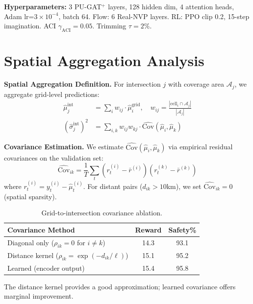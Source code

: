 \documentclass{article}
\theoremstyle{plain}
\theoremstyle{definition}
\theoremstyle{remark}
\begin{document}
\textbf{Hyperparameters:} 3 PU-GAT$^+$ layers, 128 hidden dim, 4 attention heads, Adam lr=$3\times 10^{-4}$, batch 64. Flow: 6 Real-NVP layers. RL: PPO clip 0.2, 15-step imagination. ACI $\gamma_{\text{ACI}} = 0.05$. Trimming $\tau = 2\%$.

\section{Spatial Aggregation Analysis}
\label{app:spatial}

\textbf{Spatial Aggregation Definition.} For intersection $j$ with coverage area $\mathcal{A}_j$, we aggregate grid-level predictions:
\begin{align}
\hat{\mu}_j^{\text{int}} &= \sum_{i} w_{ij} \cdot \hat{\mu}_i^{\text{grid}}, \quad w_{ij} = \frac{|\text{cell}_i \cap \mathcal{A}_j|}{|\mathcal{A}_j|} \\
(\hat{\sigma}_j^{\text{int}})^2 &= \sum_{i,k} w_{ij} w_{kj} \cdot \widehat{\text{Cov}}(\hat{\mu}_i, \hat{\mu}_k)
\end{align}

\textbf{Covariance Estimation.} We estimate $\widehat{\text{Cov}}(\hat{\mu}_i, \hat{\mu}_k)$ via empirical residual covariances on the validation set:
\begin{equation}
\widehat{\text{Cov}}_{ik} = \frac{1}{T}\sum_{t} (r_t^{(i)} - \bar{r}^{(i)})(r_t^{(k)} - \bar{r}^{(k)})
\end{equation}
where $r_t^{(i)} = y_t^{(i)} - \hat{\mu}_t^{(i)}$. For distant pairs ($d_{ik} > 10$km), we set $\widehat{\text{Cov}}_{ik} = 0$ (spatial sparsity).

\begin{table}[H]
\centering
\caption{Grid-to-intersection covariance ablation.}
\label{tab:cov_ablation}
\begin{tabular}{lcc}
\toprule
\textbf{Covariance Method} & \textbf{Reward} & \textbf{Safety\%} \\
\midrule
Diagonal only ($\rho_{ik} = 0$ for $i \neq k$) & 14.3 & 93.1 \\
Distance kernel ($\rho_{ik} = \exp(-d_{ik}/\ell)$) & 15.1 & 95.2 \\
Learned (encoder output) & 15.4 & 95.8 \\
\bottomrule
\end{tabular}
\end{table}

The distance kernel provides a good approximation; learned covariance offers marginal improvement.
\end{document}
